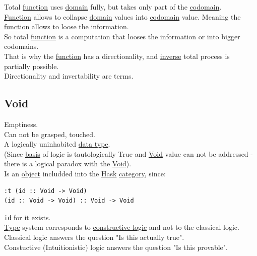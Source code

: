 \documentclass[11pt]{article}
\begin{document}
Total \hyperref[orge15bc14]{function} uses \hyperref[org494b48a]{domain} fully, but takes only part of the \hyperref[org410079d]{codomain}.\\
\hyperref[orge15bc14]{Function} allows to collapse \hyperref[org494b48a]{domain} values into \hyperref[org410079d]{codomain} value. Meaning the \hyperref[orge15bc14]{function} allows to loose the information.\\
So total \hyperref[orge15bc14]{function} is a computation that looses the information or into bigger codomains.\\
That is why the \hyperref[orge15bc14]{function} has a directionality, and \hyperref[org0da4e7e]{inverse} total process is partially possible.\\

Directionality and invertability are terms.\\

\subsection{\label{org2fad40d}Void}
\label{sec:org88653f7}

Emptiness.\\

Can not be grasped, touched.\\

A logically uninhabited \hyperref[org212d9c3]{data type}.\\

(Since \hyperref[org27d3d18]{basis} of logic is tautologically True and \hyperref[org2fad40d]{Void} value can not be addressed - there is a logical paradox with the \hyperref[org2fad40d]{Void}).\\

Is an \hyperref[org4be0e9d]{object} includded into the \hyperref[org02813f7]{Hask} \hyperref[org0450535]{category}, since:\\
\begin{verbatim}
:t (id :: Void -> Void)
(id :: Void -> Void) :: Void -> Void
\end{verbatim}

\texttt{id} for it exists.\\

\hyperref[orgc4aea2f]{Type} system corresponds to \hyperref[orgf54ffad]{constructive logic} and not to the classical logic.\\
Classical logic answers the question "Is this actually true".\\
Constuctive (Intuitionistic) logic answers the question "Is this provable".\\
\end{document}
